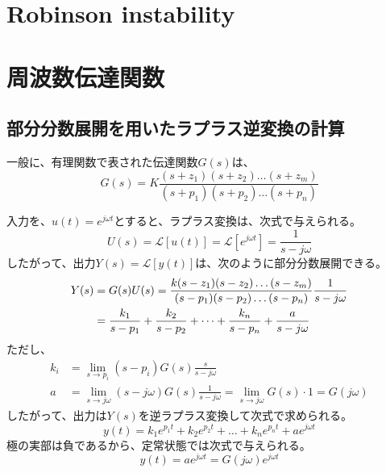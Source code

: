 \documentclass[book]{jlreq}
\begin{document}
\chapter{Robinson instability}

\appendix
\chapter{周波数伝達関数}
\section{部分分数展開を用いたラプラス逆変換の計算}
一般に、有理関数で表された伝達関数$G(s)$は、
%
\begin{equation}
    G(s)=K\frac{(s+z_1)(s+z_2)\dots(s+z_m)}{(s+p_1)(s+p_2)\dots(s+p_n)}
\end{equation}
%

入力を、$u(t)=e^{j\omega t}$とすると、ラプラス変換は、次式で与えられる。
%
\begin{equation}
    U(s)= \mathcal{L}[u(t)]=\mathcal{L}[e^{j\omega t}]=\frac{1}{s-j\omega}
\end{equation}
%
したがって、出力$Y(s)=\mathcal{L}[y(t)]$は、次のように部分分数展開できる。
%
\begin{equation}
    \begin{split}
        Y(s) &= G(s)U(s) = \frac{k(s-z_1)(s-z_2)\dots(s-z_m)}{(s-p_1)(s-p_2)\dots(s-p_n)}\frac{1}{s-j\omega} \\
        &= \frac{k_1}{s-p_1}+\frac{k_2}{s-p_2}+\dots+\frac{k_n}{s-p_n}+\frac{a}{s-j\omega}\notag
    \end{split}
\end{equation}
%
ただし、
%
\begin{equation}
    \begin{split}
        k_i &= \lim_{s \to p_i}(s-p_i)G(s)\frac{s}{s-j\omega} \\
        a &=\lim_{s \to j\omega}(s-j\omega)G(s)\frac{1}{s-j\omega} =\lim_{s \to j\omega}G(s)\cdot 1=G(j\omega)
    \end{split}
\end{equation}
%
したがって、出力は$Y(s)$を逆ラプラス変換して次式で求められる。
%
\begin{equation}
    y(t)=k_1 e^{p_1 t}+k_2 e^{p_2 t}+ \dots + k_n e^{p_n t} + a e^{j\omega t}
\end{equation}
%
極の実部は負であるから、定常状態では次式で与えられる。
%
\begin{equation}
    y(t) = a e^{j\omega t} = G(j\omega) e^{j\omega t}
\end{equation}
%
\end{document}
